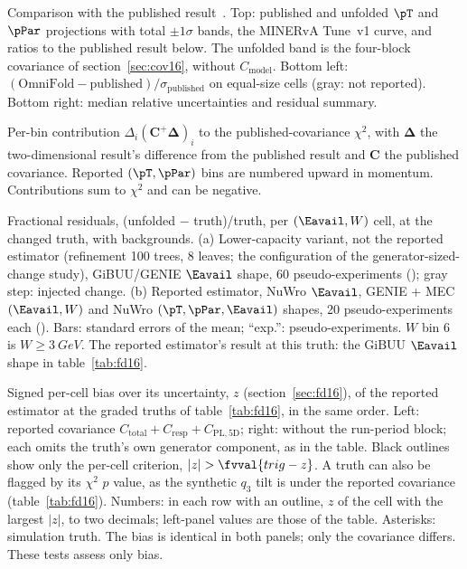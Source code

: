 \caption{Comparison with the published result~\cite{MINERvA:2021owq}. Top: published and unfolded $\pT$ and $\pPar$ projections with total $\pm1\sigma$ bands, the MINERvA Tune~v1 curve, and ratios to the published result below. The unfolded band is the four-block covariance of section~\ref{sec:cov16}, without $C_{\mathrm{model}}$. Bottom left: $(\mathrm{OmniFold}-\mathrm{published})/\sigma_{\mathrm{published}}$ on equal-size cells (gray: not reported). Bottom right: median relative uncertainties and residual summary.}

\caption{Per-bin contribution $\Delta_i(\mathbf C^+\boldsymbol\Delta)_i$ to the published-covariance $\chi^2$, with $\boldsymbol\Delta$ the two-dimensional result's difference from the published result and $\mathbf C$ the published covariance. Reported $(\pT,\pPar)$ bins are numbered upward in momentum. Contributions sum to $\chi^2$ and can be negative.}

\caption{Fractional residuals, (unfolded $-$ truth)/truth, per $(\Eavail,W)$ cell, at the changed truth, with backgrounds. (a) Lower-capacity variant, not the reported estimator (refinement 100 trees, 8 leaves; the configuration of the generator-sized-change study), GiBUU/GENIE $\Eavail$ shape, 60 pseudo-experiments (); gray step: injected change. (b) Reported estimator, NuWro $\Eavail$, GENIE + MEC $(\Eavail,W)$ and NuWro $(\pT,\pPar,\Eavail)$ shapes, 20 pseudo-experiments each (). Bars: standard errors of the mean; ``exp.'': pseudo-experiments. $W$ bin 6 is $W\ge\SI{3}{GeV}$. The reported estimator's result at this truth: the GiBUU $\Eavail$ shape in table~\ref{tab:fd16}.}

\caption{Signed per-cell bias over its uncertainty, $z$ (section~\ref{sec:fd16}), of the reported estimator at the  graded truths of table~\ref{tab:fd16}, in the same order. Left: reported covariance $C_{\mathrm{total}}+C_{\mathrm{resp}}+C_{\mathrm{PL,5D}}$; right: without the run-period block; each omits the truth's own generator component, as in the table. Black outlines show only the per-cell criterion, $|z|>\fvval{trig-z}$. A truth can also be flagged by its $\chi^2$ $p$ value, as the synthetic $q_3$ tilt is under the reported covariance (table~\ref{tab:fd16}). Numbers: in each row with an outline, $z$ of the cell with the largest $|z|$, to two decimals; left-panel values are those of the table. Asterisks: simulation truth. The bias is identical in both panels; only the covariance differs. These tests assess only bias.}

